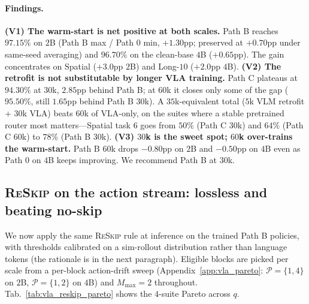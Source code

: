 \documentclass{article}
\newcommand{\reskip}{\textsc{ReSkip}}
\begin{document}
\paragraph{Findings.}
\textbf{(V1) The warm-start is net positive at both scales.} Path B reaches $97.15\%$ on $2$B (Path B max / Path 0 min, $+1.30$pp; preserved at $+0.70$pp under same-seed averaging) and $96.70\%$ on the clean-base $4$B ($+0.65$pp). The gain concentrates on Spatial ($+3.0$pp $2$B) and Long-$10$ ($+2.0$pp $4$B).
\textbf{(V2) The retrofit is not substitutable by longer VLA training.} Path C plateaus at $94.30\%$ at $30$k, $2.85$pp behind Path B; at $60$k it closes only some of the gap ($95.50\%$, still $1.65$pp behind Path B $30$k). A $35$k-equivalent total ($5$k VLM retrofit + $30$k VLA) beats $60$k of VLA-only, on the suites where a stable pretrained router most matters---Spatial task $6$ goes from $50\%$ (Path C $30$k) and $64\%$ (Path C $60$k) to $78\%$ (Path B $30$k).
\textbf{(V3) $30$k is the sweet spot; $60$k over-trains the warm-start.} Path B $60$k drops $-0.80$pp on $2$B and $-0.50$pp on $4$B even as Path 0 on $4$B keeps improving. We recommend Path B at $30$k.

\subsection{\reskip{} on the action stream: lossless and beating no-skip}
\label{sec:vla_reskip}

We now apply the same \reskip{} rule at inference on the trained Path B policies, with thresholds calibrated on a sim-rollout distribution rather than language tokens (the rationale is in the next paragraph). Eligible blocks are picked per scale from a per-block action-drift sweep (Appendix~\ref{app:vla_pareto}: $\mathcal{P}{=}\{1,4\}$ on $2$B, $\mathcal{P}{=}\{1,2\}$ on $4$B) and $M_{\max}{=}2$ throughout. Tab.~\ref{tab:vla_reskip_pareto} shows the $4$-suite Pareto across $q$.
\end{document}
